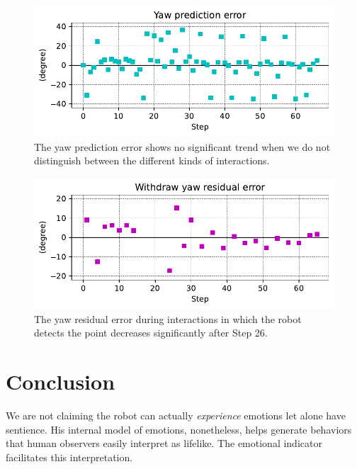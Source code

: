 \documentclass[runningheads]{llncs}
\begin{document}
\begin{figure}
	\includegraphics[width=\textwidth]{02_yaw_pe.pdf}
	\caption{The yaw prediction error shows no significant trend when we do not distinguish between the different kinds of interactions.} \label{fig:yaw_pe}
\end{figure}

\begin{figure}
	\includegraphics[width=\textwidth]{03_yaw_re.pdf}
	\caption{The yaw residual error during interactions in which the robot detects the point decreases significantly after Step 26.} \label{fig:yaw_re}
\end{figure}


\section{Conclusion}

We are not claiming the robot can actually \textit{experience} emotions let alone have sentience. 
His internal model of emotions, nonetheless, helps generate behaviors that human observers easily interpret as lifelike. 
The emotional indicator facilitates this interpretation. 
\end{document}
